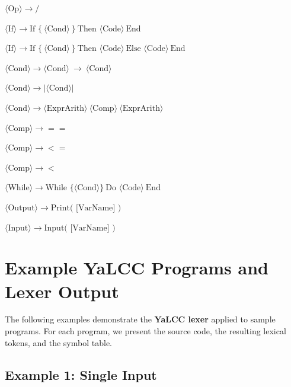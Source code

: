 \documentclass{article}
\begin{document}
\begin{enumerate}[label={[\,\arabic*\,]},leftmargin=*,itemsep=4pt]
  \item \(\langle\text{Op}\rangle \rightarrow /\)
  \item \(\langle\text{If}\rangle \rightarrow \text{If }\{\ \langle\text{Cond}\rangle\ \}\ \text{Then }\langle\text{Code}\rangle\ \text{End}\)
  \item \(\langle\text{If}\rangle \rightarrow \text{If }\{\ \langle\text{Cond}\rangle\ \}\ \text{Then }\langle\text{Code}\rangle\ \text{Else }\langle\text{Code}\rangle\ \text{End}\)
  \item \(\langle\text{Cond}\rangle \rightarrow \langle\text{Cond}\rangle\ \rightarrow\ \langle\text{Cond}\rangle\)  %
  \item \(\langle\text{Cond}\rangle \rightarrow \lvert\langle\text{Cond}\rangle\rvert\)
  \item \(\langle\text{Cond}\rangle \rightarrow \langle\text{ExprArith}\rangle\ \langle\text{Comp}\rangle\ \langle\text{ExprArith}\rangle\)
  \item \(\langle\text{Comp}\rangle \rightarrow ==\)
  \item \(\langle\text{Comp}\rangle \rightarrow <=\)
  \item \(\langle\text{Comp}\rangle \rightarrow <\)
  \item \(\langle\text{While}\rangle \rightarrow \text{While }\{\langle\text{Cond}\rangle\}\ \text{Do }\langle\text{Code}\rangle\ \text{End}\)
  \item \(\langle\text{Output}\rangle \rightarrow \text{Print( [VarName] )}\)
  \item \(\langle\text{Input}\rangle \rightarrow \text{Input( [VarName] )}\)
\end{enumerate}

\newpage

\section{Example YaLCC Programs and Lexer Output}
\label{appendix:example-ycc}

\noindent The following examples demonstrate the \textbf{YaLCC lexer} applied to sample programs. For each program, we present the source code, the resulting lexical tokens, and the symbol table.

\subsection*{Example 1: Single Input}
\end{document}
